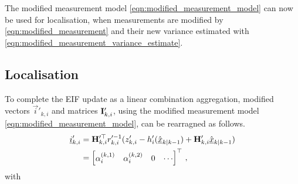 \documentclass[10pt,letterpaper,oneside,twocolumn,journal]{IEEEtran}
\theoremstyle{definition}
\theoremstyle{definition}
\theoremstyle{remark}
\begin{document}
The modified measurement model \eqref{eqn:modified_measurement_model} can now be used for localisation, when measurements are modified by \eqref{eqn:modified_measurement} and their new variance estimated with \eqref{eqn:modified_measurement_variance_estimate}.

% 
% 

\subsection{Localisation} \label{subsec:localisation}
To complete the EIF update as a linear combination aggregation, modified vectors $\vec{i}'_{k,i}$ and matrices ${{\mathbf{I}}}'_{k,i}$, using the modified measurement model \eqref{eqn:modified_measurement_model}, can be rearragned as follows.
\begin{equation}
    \begin{split}
        \vec{i}'_{k,i} &= \mat{H}_{k,i}^{\prime\top} r_{k,i}^{\prime-1}(z'_{k,i} - h'_i(\hat{\vec{x}}_{k|k-1}) + \mat{H}'_{k,i}\hat{\vec{x}}_{k|k-1}) \\
        &= 
        \begin{bmatrix}
            \alpha_i^{(k,1)} & \alpha_i^{(k,2)} & 0 & \cdots
        \end{bmatrix}^\top\,,
    \end{split} \label{eqn:hrz_linear_comb}
\end{equation}
with
\end{document}
